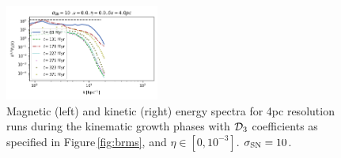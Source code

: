 \documentclass[iop,apj,numberedappendix,twocolappendix]{emulateapj}
\begin{document}
\begin{figure}
\includegraphics[trim=0.0cm 0.00cm 0.0cm 0.0cm,clip=true,width=0.45\textwidth]{csc_figs/4pcPm0e-0_02SNkpower.png}
\caption{
Magnetic (left) and kinetic (right) energy spectra for 4pc resolution runs 
during the kinematic growth phases with ${\cal D}_3$ 
coefficients as specified in Figure\,\ref{fig:brms}, and $\eta\in[0,10^{-3}]$.
$\sigma_{\rm SN}=10$.
\label{fig:4spectra10SN}
}
\end{figure}
\end{document}

